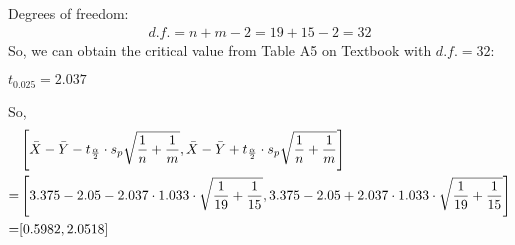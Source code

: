 \documentclass[12pt]{article}
\begin{document}
Degrees of freedom:
\begin{equation}
    \begin{split}
        d.f. = n+m-2 = 19+15-2=32        
    \end{split}
\end{equation}
So, we can obtain the critical value from Table A5 on Textbook with $d.f. = 32$:
\begin{center}
    $t_{0.025} = 2.037$
\end{center}
So, 
\begin{equation}
    \begin{split}
        & \left[ \Bar{X} - \Bar{Y} - t_{\frac{\alpha}{2}} \cdot s_p \sqrt{\dfrac{1}{n}+\dfrac{1}{m}}, \Bar{X} - \Bar{Y} + t_{\frac{\alpha}{2}} \cdot s_p \sqrt{\dfrac{1}{n}+\dfrac{1}{m}} \right] \\
        =& \left[ 3.375 - 2.05 - 2.037 \cdot 1.033 \cdot \sqrt{\dfrac{1}{19}+\dfrac{1}{15}}, 3.375 - 2.05 + 2.037 \cdot 1.033 \cdot \sqrt{\dfrac{1}{19}+\dfrac{1}{15}} \right] \\
        =&[0.5982, 2.0518]
    \end{split}
\end{equation}
\end{document}
